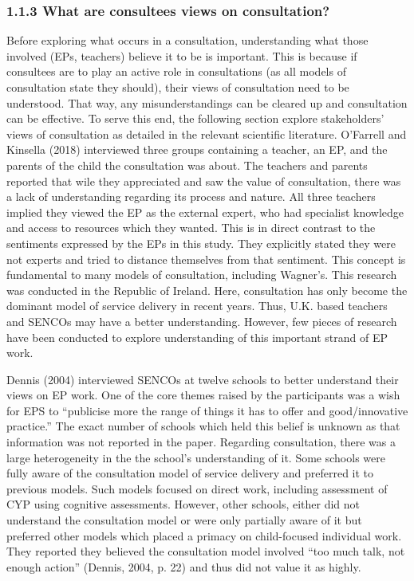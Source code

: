\documentclass[
  english,
  man]{apa}
\begin{document}
\hypertarget{what-are-consultees-views-on-consultation}{%
\subsubsection{1.1.3 What are consultees views on consultation?}\label{what-are-consultees-views-on-consultation}}

Before exploring what occurs in a consultation, understanding what those involved (EPs, teachers) believe it to be is important. This is because if consultees are to play an active role in consultations (as all models of consultation state they should), their views of consultation need to be understood. That way, any misunderstandings can be cleared up and consultation can be effective. To serve this end, the following section explore stakeholders' views of consultation as detailed in the relevant scientific literature. O'Farrell and Kinsella (2018) interviewed three groups containing a teacher, an EP, and the parents of the child the consultation was about. The teachers and parents reported that wile they appreciated and saw the value of consultation, there was a lack of understanding regarding its process and nature. All three teachers implied they viewed the EP as the external expert, who had specialist knowledge and access to resources which they wanted. This is in direct contrast to the sentiments expressed by the EPs in this study. They explicitly stated they were not experts and tried to distance themselves from that sentiment. This concept is fundamental to many models of consultation, including Wagner's. This research was conducted in the Republic of Ireland. Here, consultation has only become the dominant model of service delivery in recent years. Thus, U.K. based teachers and SENCOs may have a better understanding. However, few pieces of research have been conducted to explore understanding of this important strand of EP work.

Dennis (2004) interviewed SENCOs at twelve schools to better understand their views on EP work. One of the core themes raised by the participants was a wish for EPS to ``publicise more the range of things it has to offer and good/innovative practice.'' The exact number of schools which held this belief is unknown as that information was not reported in the paper. Regarding consultation, there was a large heterogeneity in the the school's understanding of it. Some schools were fully aware of the consultation model of service delivery and preferred it to previous models. Such models focused on direct work, including assessment of CYP using cognitive assessments. However, other schools, either did not understand the consultation model or were only partially aware of it but preferred other models which placed a primacy on child-focused individual work. They reported they believed the consultation model involved ``too much talk, not enough action'' (Dennis, 2004, p. 22) and thus did not value it as highly.
\end{document}
